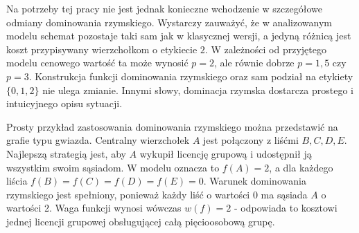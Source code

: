 
Na potrzeby tej pracy nie jest jednak konieczne wchodzenie w szczegółowe odmiany dominowania rzymskiego. Wystarczy zauważyć, że w analizowanym modelu schemat pozostaje taki sam jak w klasycznej wersji, a jedyną różnicą jest koszt przypisywany wierzchołkom o etykiecie $2$. W zależności od przyjętego modelu cenowego wartość ta może wynosić $p=2$, ale równie dobrze $p=1{,}5$ czy $p=3$. Konstrukcja funkcji dominowania rzymskiego oraz sam podział na etykiety $\{0,1,2\}$ nie ulega zmianie. Innymi słowy, dominacja rzymska dostarcza prostego i intuicyjnego opisu sytuacji.



Prosty przykład zastosowania dominowania rzymskiego można przedstawić na grafie typu gwiazda. Centralny wierzchołek $A$ jest połączony z liśćmi $B, C, D, E$. Najlepszą strategią jest, aby $A$ wykupił licencję grupową i udostępnił ją wszystkim swoim sąsiadom. W modelu oznacza to $f(A)=2$, a dla każdego liścia $f(B)=f(C)=f(D)=f(E)=0$. Warunek dominowania rzymskiego jest spełniony, ponieważ każdy liść o wartości 0 ma sąsiada $A$ o wartości 2. Waga funkcji wynosi wówczas $w(f)=2$ - odpowiada to kosztowi jednej licencji grupowej obsługującej całą pięcioosobową grupę.

